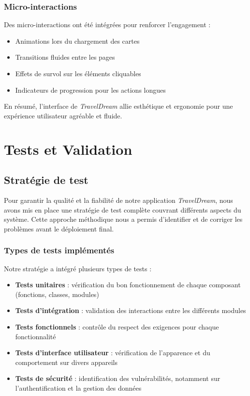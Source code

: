 \documentclass[a4paper,12pt]{article}
\begin{document}
\subsubsection{Micro-interactions}
Des micro-interactions ont été intégrées pour renforcer l’engagement :
\begin{itemize}
  \item Animations lors du chargement des cartes
  \item Transitions fluides entre les pages
  \item Effets de survol sur les éléments cliquables
  \item Indicateurs de progression pour les actions longues
\end{itemize}

\vspace{0.5cm}
En résumé, l’interface de \textit{TravelDream} allie esthétique et ergonomie pour une expérience utilisateur agréable et fluide.
\section{Tests et Validation}

\subsection{Stratégie de test}
Pour garantir la qualité et la fiabilité de notre application \textit{TravelDream}, nous avons mis en place une stratégie de test complète couvrant différents aspects du système. Cette approche méthodique nous a permis d'identifier et de corriger les problèmes avant le déploiement final.

\subsubsection{Types de tests implémentés}
Notre stratégie a intégré plusieurs types de tests :
\begin{itemize}
  \item \textbf{Tests unitaires} : vérification du bon fonctionnement de chaque composant (fonctions, classes, modules)
  \item \textbf{Tests d'intégration} : validation des interactions entre les différents modules
  \item \textbf{Tests fonctionnels} : contrôle du respect des exigences pour chaque fonctionnalité
  \item \textbf{Tests d’interface utilisateur} : vérification de l'apparence et du comportement sur divers appareils
  \item \textbf{Tests de sécurité} : identification des vulnérabilités, notamment sur l’authentification et la gestion des données
\end{itemize}
\end{document}
